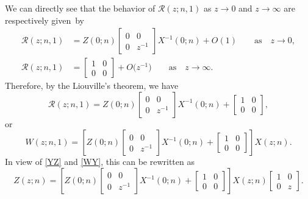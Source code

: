 \documentclass[pdftex]{sigma}
\numberwithin{equation}{section}
\newcommand{\qasq}{\qquad \text{as} \quad}
\begin{document}
	
	We can directly see that the behavior of $\mathscr{R}(z;n,1)$ as $z \to 0$ and $z \to \infty$ are respectively given~by
	\begin{align*}
		\mathscr{R}(z;n,1) & = Z(0;n) \begin{bmatrix}
			0 & 0 \\
			0 & z^{-1}
		\end{bmatrix} X^{-1}(0;n) + O(1) \qasq z \to 0, \\
		\mathscr{R}(z;n,1) & = \begin{bmatrix}
			1 & 0 \\
			0 & 0
		\end{bmatrix} + O\big(z^{-1}\big) \qasq z \to \infty.
	\end{align*}
	Therefore, by the Liouville's theorem, we have
	\begin{equation*}
		\mathscr{R}(z;n,1) = Z(0;n) \begin{bmatrix}
			0 & 0 \\
			0 & z^{-1}
		\end{bmatrix} X^{-1}(0;n) + \begin{bmatrix}
			1 & 0 \\
			0 & 0
		\end{bmatrix},
	\end{equation*}
	or
	\begin{equation*}
		W(z;n,1) = \left[ Z(0;n) \begin{bmatrix}
			0 & 0 \\
			0 & z^{-1}
		\end{bmatrix} X^{-1}(0;n) + \begin{bmatrix}
			1 & 0 \\
			0 & 0
		\end{bmatrix} \right] X(z;n).
	\end{equation*}
	In view of \eqref{YZ} and \eqref{WY}, this can be rewritten as
	\begin{equation}\label{ZX}
		Z(z;n) = \left[ Z(0;n) \begin{bmatrix}
			0 & 0 \\
			0 & z^{-1}
		\end{bmatrix} X^{-1}(0;n) + \begin{bmatrix}
			1 & 0 \\
			0 & 0
		\end{bmatrix} \right] X(z;n) \begin{bmatrix}
			1 & 0 \\
			0 & z
		\end{bmatrix}.
	\end{equation}
\end{document}
